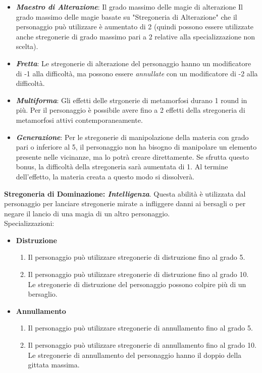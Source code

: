\documentclass[../manuale_main.tex]{subfiles}
\begin{document}
\begin{itemize}
\item \textbf{\textit{Maestro di Alterazione}}: Il grado massimo delle magie di alterazione Il grado massimo delle magie basate su "Stregoneria di Alterazione" che il personaggio può utilizzare è aumentato di 2 (quindi possono essere utilizzate anche stregonerie di grado massimo pari a 2 relative alla specializzazione non scelta).
\item \textbf{\textit{Fretta}}: Le stregonerie di alterazione del personaggio hanno un modificatore di -1 alla difficoltà, ma possono essere \textit{annullate} con un modificatore di -2 alla difficoltà.
\item \textbf{\textit{Multiforma}}: Gli effetti delle strgonerie di metamorfosi durano 1 round in più. Per il personaggio è possibile avere fino a 2 effetti della stregoneria di metamorfosi attivi contemporaneamente.
\item \textbf{\textit{Generazione}}: Per le stregonerie di manipolazione della materia con grado pari o inferiore al 5, il personaggio non ha bisogno di manipolare un elemento presente nelle vicinanze, ma lo potrà creare direttamente. Se sfrutta questo bonus, la difficoltà della stregoneria sarà aumentata di 1. Al termine dell'effetto, la materia creata a questo modo si dissolverà.
\end{itemize}

\textbf{Stregoneria di Dominazione: \textit{Intelligenza}}. Questa abilità è utilizzata dal personaggio per lanciare stregonerie mirate a infliggere danni ai bersagli o per negare il lancio di una magia di un altro personaggio.
\\Specializzazioni:

\begin{itemize} 
\item\textbf{Distruzione}
\begin{enumerate}
\item Il personaggio può utilizzare stregonerie di distruzione fino al grado 5.
\item Il personaggio può utilizzare stregonerie di distruzione fino al grado 10. Le stregonerie di distruzione del personaggio possono colpire più di un bersaglio.

\end{enumerate}

\item\textbf{Annullamento}
\begin{enumerate}
\item Il personaggio può utilizzare stregonerie di annullamento fino al grado 5.
\item Il personaggio può utilizzare stregonerie di annullamento fino al grado 10. Le stregonerie di annullamento del personaggio hanno il doppio della gittata massima.

\end{enumerate}
\end{itemize}
\end{document}
